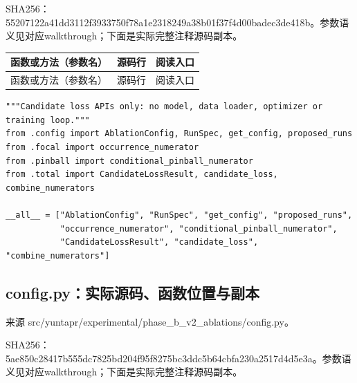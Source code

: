 \documentclass[UTF8,fontset=fandol,10pt]{ctexart}
\begin{document}
SHA256：55207122a41d\allowbreak{}d3112f393375\allowbreak{}0f78a1e23182\allowbreak{}49a38b01f37f\allowbreak{}4d00badec3de\allowbreak{}418b。参数语义见对应walkthrough；下面是实际完整注释源码副本。

\begingroup\small\setlength{\tabcolsep}{3pt}\renewcommand{\arraystretch}{1.12}
\begin{longtable}{>{\raggedright\arraybackslash}p{\dimexpr(\linewidth-6\tabcolsep)/3\relax}>{\raggedright\arraybackslash}p{\dimexpr(\linewidth-6\tabcolsep)/3\relax}>{\raggedright\arraybackslash}p{\dimexpr(\linewidth-6\tabcolsep)/3\relax}}
\toprule
函数或方法（参数名） & 源码行 & 阅读入口 \\
\midrule\endfirsthead
函数或方法（参数名） & 源码行 & 阅读入口 \\
\midrule\endhead
\bottomrule\end{longtable}\endgroup

\begin{lstlisting}
"""Candidate loss APIs only: no model, data loader, optimizer or training loop."""
from .config import AblationConfig, RunSpec, get_config, proposed_runs
from .focal import occurrence_numerator
from .pinball import conditional_pinball_numerator
from .total import CandidateLossResult, candidate_loss, combine_numerators

__all__ = ["AblationConfig", "RunSpec", "get_config", "proposed_runs",
           "occurrence_numerator", "conditional_pinball_numerator",
           "CandidateLossResult", "candidate_loss", "combine_numerators"]
\end{lstlisting}


\subsection{config.py：实际源码、函数位置与副本}

来源 src/\allowbreak{}yuntapr/\allowbreak{}experimental/\allowbreak{}phase\_\allowbreak{}b\_\allowbreak{}v2\_\allowbreak{}ablations/\allowbreak{}config.py。

SHA256：5ae850c28417\allowbreak{}b555dc7825bd\allowbreak{}204f95f8275b\allowbreak{}c3ddc5b64cbf\allowbreak{}a230a2517d4d\allowbreak{}5e3a。参数语义见对应walkthrough；下面是实际完整注释源码副本。
\end{document}
